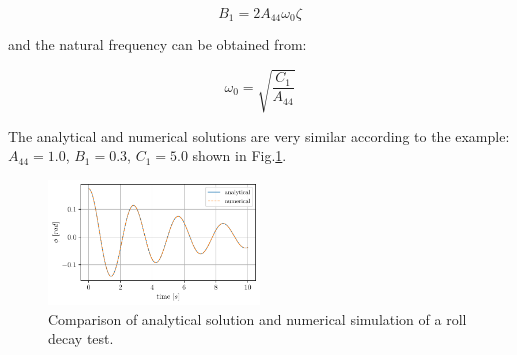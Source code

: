             
    
    \begin{equation}
B_{1} = 2 A_{44} \omega_{0} \zeta
\label{eq:B_1_zeta_eq}
\end{equation}

    

    and the natural frequency can be obtained from:
 
            
    
    \begin{equation}
\omega_{0} = \sqrt{\frac{C_{1}}{A_{44}}}
\label{eq:omega0_eq}
\end{equation}

    

    The analytical and numerical solutions are very similar according to the
example: $A_{44} = 1.0$, $B_1 = 0.3$, $C_1 = 5.0$ shown in
Fig.\ref{fig:analytical_numerical}.

    

    \begin{figure}[H]
        \begin{center}\includegraphics[width = 0.5\textwidth]{figures/analytical_numerical.pdf}\end{center}
        \vspace{-1cm}
        \caption{Comparison of analytical solution and numerical simulation of a roll decay test.}
        \label{fig:analytical_numerical}
    \end{figure}
    
    